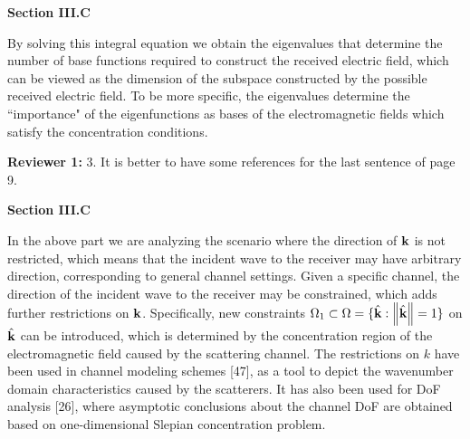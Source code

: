 \documentclass[a4paper,12pt]{article}
\begin{document}
{}

\begin{framed}
	{\bf Section III.C}

  By solving this integral equation we obtain the eigenvalues that determine the number of base functions required to construct the received electric field, which can be viewed as the dimension of the subspace constructed by the possible received electric field. To be more specific, the eigenvalues determine the {\color{red}``importance"} of the eigenfunctions as bases of the electromagnetic fields which satisfy the concentration conditions.

\end{framed}

\textbf{Reviewer 1:}
3. It is better to have some references for the last sentence of page 9. 

{}

\begin{framed}
	{\bf Section III.C}
	
	In the above part we are analyzing the scenario where the direction of ${\bf k}$ is not restricted, which means that the incident wave to the receiver may have arbitrary direction, corresponding to general channel settings. Given a specific channel, the direction of the incident wave to the receiver may be constrained, which adds further restrictions on ${\bf k}$.  Specifically, new constraints ${\Omega}_1 \subset {\Omega}=\{\hat{\bf k}: \left\| \hat{\bf k} \right\|=1\}$ on $\hat{\bf k}$ can be introduced, which is determined by the concentration region of the electromagnetic field caused by the scattering channel. {\color{red} The restrictions on $k$ have been used in channel modeling schemes [47], as a tool to depict the wavenumber domain characteristics caused by the scatterers.
		It has also been used for DoF analysis [26], where asymptotic conclusions about the channel DoF are obtained based on one-dimensional Slepian concentration problem. } 
  
\end{framed}
\end{document}
